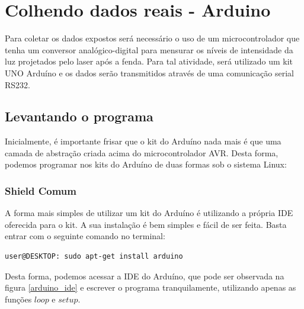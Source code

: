 \section{Colhendo dados reais - Arduino}\label{arduino}

Para coletar os dados expostos será necessário o uso de um microcontrolador que tenha um conversor analógico-digital para mensurar os níveis de intensidade da luz projetados pelo laser após a fenda. Para tal atividade, será utilizado um kit UNO Arduíno e os dados serão transmitidos através de uma comunicação serial RS232.


\subsection{Levantando o programa}\label{program_arduino}

Inicialmente, é importante frisar que o kit do Arduíno nada mais é que uma camada de abstração criada acima do microcontrolador AVR. Desta forma, podemos programar nos kits do Arduíno de duas formas sob o sistema Linux:

\subsubsection{Shield Comum}\label{noob}

A forma mais simples de utilizar um kit do Arduíno é utilizando a própria IDE oferecida para o kit. A sua instalação é bem simples e fácil de ser feita. Basta entrar com o seguinte comando no terminal:


\begin{lstlisting}[style=Bash,numbers=none]
user@DESKTOP: sudo apt-get install arduino
\end{lstlisting}

Desta forma, podemos acessar a IDE do Arduíno, que pode ser observada na figura \ref{arduino_ide} e escrever o programa tranquilamente, utilizando apenas as funções $loop$ e $setup$.

